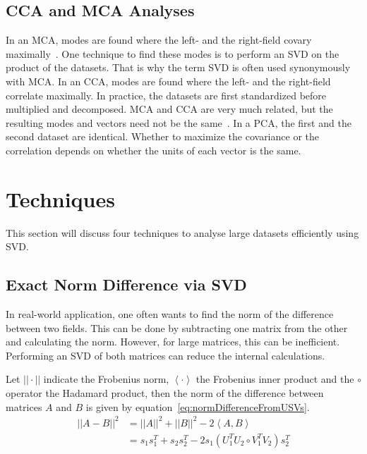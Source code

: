 \documentclass{acm_proc_article-sp}
\begin{document}
\subsection{CCA and MCA Analyses}
\label{sec:Introduction CCA and MCA Analyses}

In an MCA, modes are found where the left- and the right-field covary maximally~\cite{Bretherton1992}. One technique to find these modes is to perform an SVD on the product of the datasets. That is why the term SVD is often used synonymously with MCA.
In an CCA, modes are found where the left- and the right-field correlate maximally. In practice, the datasets are first standardized before multiplied and decomposed. MCA and CCA are very much related, but the resulting modes and vectors need not be the same~\cite{Bretherton1992}.
In a PCA, the first and the second dataset are identical. Whether to maximize the covariance or the correlation depends on whether the units of each vector is the same.

\section{Techniques}
\label{Techniques}

This section will discuss four techniques to analyse large datasets efficiently using SVD.

\subsection{Exact Norm Difference via SVD}
\label{sec:Techniques Exact Norm Difference via SVD}

In real-world application, one often wants to find the norm of the difference between two fields. This can be done by subtracting one matrix from the other and calculating the norm. However, for large matrices, this can be inefficient. Performing an SVD of both matrices can reduce the internal calculations.

Let $|| \cdot ||$ indicate the Frobenius norm, $\left\langle \cdot \right\rangle$ the Frobenius inner product and the $\circ$ operator the Hadamard product, then the norm of the difference between matrices $A$ and $B$ is given by equation~\ref{eq:normDifferenceFromUSVs}.
\begin{equation}
\label{eq:normDifferenceFromUSVs}
\begin{split}
||A-B||^{2} & = ||A||^{2} + ||B||^{2} - 2 \left\langle A, B \right\rangle \\
& = s_{1} s_{1}^{T} +  s_{2} s_{2}^{T} - 2 s_{1} \left( U_{1}^{T} U_{2} \circ V_{1}^{T} V_{2} \right) s_{2}^{T}
\end{split}
\end{equation}
\end{document}
